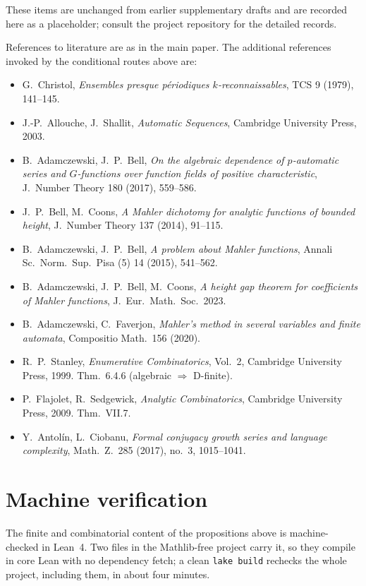 \documentclass[11pt,a4paper]{article}
\theoremstyle{remark}
\theoremstyle{plain}
\begin{document}
These items are unchanged from earlier supplementary drafts and are
recorded here as a placeholder; consult the project repository for the
detailed records.


References to literature are as in the main paper.  The additional
references invoked by the conditional routes above are:
\begin{itemize}[leftmargin=2em,itemsep=0.2em]
\item G.~Christol, \emph{Ensembles presque p\'eriodiques
$k$-reconnaissables}, TCS 9 (1979), 141--145.
\item J.-P.~Allouche, J.~Shallit, \emph{Automatic Sequences},
Cambridge University Press, 2003.
\item B.~Adamczewski, J.~P.~Bell, \emph{On the algebraic dependence of
$p$-automatic series and $G$-functions over function fields of
positive characteristic}, J.~Number Theory 180 (2017), 559--586.
\item J.~P.~Bell, M.~Coons, \emph{A Mahler dichotomy for analytic
functions of bounded height}, J.~Number Theory 137 (2014), 91--115.
\item B.~Adamczewski, J.~P.~Bell, \emph{A problem about Mahler
functions}, Annali Sc.~Norm.~Sup.~Pisa (5) 14 (2015), 541--562.
\item B.~Adamczewski, J.~P.~Bell, M.~Coons, \emph{A height gap theorem
for coefficients of Mahler functions}, J.~Eur.~Math.~Soc.\ 2023.
\item B.~Adamczewski, C.~Faverjon, \emph{Mahler's method in several
variables and finite automata}, Compositio Math.\ 156 (2020).
\item R.~P.~Stanley, \emph{Enumerative Combinatorics}, Vol.~2,
Cambridge University Press, 1999.  Thm.~6.4.6 (algebraic $\Rightarrow$
D-finite).
\item P.~Flajolet, R.~Sedgewick, \emph{Analytic Combinatorics},
Cambridge University Press, 2009.  Thm.~VII.7.
\item Y.~Antol\'in, L.~Ciobanu, \emph{Formal conjugacy growth series
and language complexity}, Math.\ Z.\ 285 (2017), no.~3, 1015--1041.
\end{itemize}


\section{Machine verification}
\label{sec:extra-lean}

The finite and combinatorial content of the propositions above is machine-checked in Lean~4.
Two files in the Mathlib-free project carry it, so they compile in core Lean with no
dependency fetch; a clean \texttt{lake build} rechecks the whole project, including them, in
about four minutes.
\end{document}
